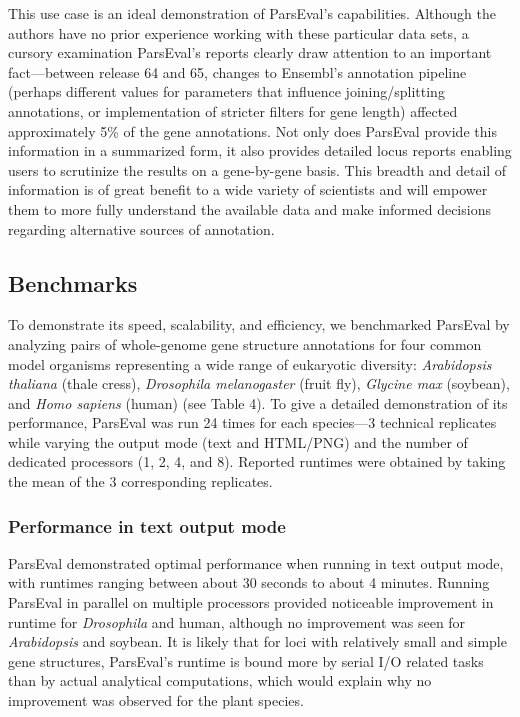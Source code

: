 This use case is an ideal demonstration of ParsEval's capabilities.
Although the authors have no prior experience working with these particular data sets, a cursory examination ParsEval's reports clearly draw attention to an important fact---between release 64 and 65, changes to Ensembl's annotation pipeline (perhaps different values for parameters that influence joining/splitting annotations, or implementation of stricter filters for gene length) affected approximately 5\% of the gene annotations.
Not only does ParsEval provide this information in a summarized form, it also provides detailed locus reports enabling users to scrutinize the results on a gene-by-gene basis.
This breadth and detail of information is of great benefit to a wide variety of scientists and will empower them to more fully understand the available data and make informed decisions regarding alternative sources of annotation.


\subsection{Benchmarks}
To demonstrate its speed, scalability, and efficiency, we benchmarked ParsEval by analyzing pairs of whole-genome gene structure annotations for four common model organisms representing a wide range of eukaryotic diversity: \textit{Arabidopsis thaliana} (thale cress), \textit{Drosophila melanogaster} (fruit fly), \textit{Glycine max} (soybean), and \textit{Homo sapiens} (human) (see Table 4).
To give a detailed demonstration of its performance, ParsEval was run 24 times for each species---3 technical replicates while varying the output mode (text and HTML/PNG) and the number of dedicated processors (1, 2, 4, and 8).
Reported runtimes were obtained by taking the mean of the 3 corresponding replicates.


\subsubsection{Performance in text output mode}
ParsEval demonstrated optimal performance when running in text output mode, with runtimes ranging between about 30 seconds to about 4 minutes.
Running ParsEval in parallel on multiple processors provided noticeable improvement in runtime for \textit{Drosophila} and human, although no improvement was seen for \textit{Arabidopsis} and soybean.
It is likely that for loci with relatively small and simple gene structures, ParsEval's runtime is bound more by serial I/O related tasks than by actual analytical computations, which would explain why no improvement was observed for the plant species.


